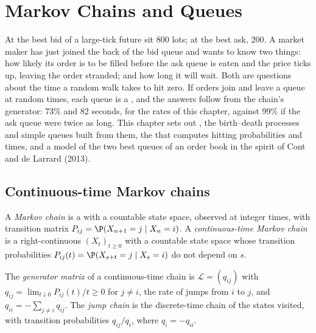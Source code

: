 \chapter{Markov Chains and Queues}\label{ch:qm:markov-chains-and-queues}

At the best bid of a large-tick future sit 800 lots; at the best ask, 200. A market maker has just
joined the back of the bid queue and wants to know two things: how likely its order is to be filled
before the ask queue is eaten and the price ticks up, leaving the order stranded; and how long it
will wait. Both are questions about the time a random walk takes to hit zero. If orders join and
leave a queue at random times, each queue is a , and the answers follow from the
chain's generator: 73\% and 82 seconds, for the rates of this chapter, against 99\% if the ask queue
were twice as long. This chapter sets out , the birth--death processes
and simple queues built from them, the  that computes hitting probabilities and
times, and a model of the two best queues of an order book in the spirit of Cont and de Larrard
(2013).

\section{Continuous-time Markov chains}

\begin{definition}\label{def:qm:markov-chains-and-queues:ctmc}
A \emph{Markov chain} is a  with a countable state space, observed
at integer times, with transition matrix $P_{ij} = \P(X_{n+1} = j \mid X_n = i)$. A
\emph{continuous-time Markov chain} is a right-continuous  $(X_t)_{t\ge0}$ with a countable state space whose transition probabilities $P_{ij}(t) = \P(X_{s+t}
= j \mid X_s = i)$ do not depend on $s$.
\end{definition}

\begin{definition}\label{def:qm:markov-chains-and-queues:generator}
The \emph{generator matrix} of a continuous-time chain is $\mathcal L = (q_{ij})$ with $q_{ij}
= \lim_{t\downarrow0}P_{ij}(t)/t \ge 0$ for $j \ne i$, the rate of jumps from $i$ to $j$, and $q_{ii} = -\sum_{j\ne i}q_{ij}$. The
\emph{jump chain} is the discrete-time chain of the states visited, with transition
probabilities $q_{ij}/q_i$, where $q_i = -q_{ii}$.
\end{definition}

